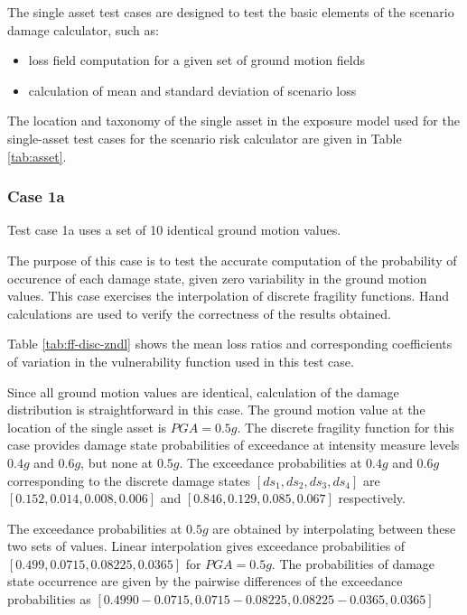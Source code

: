 The single asset test cases are designed to test the basic elements of the scenario damage calculator, such as:

\begin{itemize}
\item loss field computation for a given set of ground motion fields
\item calculation of mean and standard deviation of scenario loss
\end{itemize}

The location and taxonomy of the single asset in the exposure model used for the single-asset test cases for the scenario risk calculator are given in Table \ref{tab:asset}.

\subsubsection{Case 1a}
Test case 1a uses a set of 10 identical ground motion values.

The purpose of this case is to test the accurate computation of the probability of occurence of each damage state, given zero variability in the ground motion values. This case exercises the interpolation of discrete fragility functions. Hand calculations are used to verify the correctness of the results obtained.

% 




Table \ref{tab:ff-disc-zndl} shows the mean loss ratios and corresponding coefficients of variation in the vulnerability function used in this test case.

Since all ground motion values are identical, calculation of the damage distribution is straightforward in this case. The ground motion value at the location of the single asset is $PGA = 0.5 g$. The discrete fragility function for this case provides damage state probabilities of exceedance at intensity measure levels $0.4 g$ and $0.6 g$, but none at $0.5 g$. The exceedance probabilities at $0.4 g$ and $0.6 g$ corresponding to the discrete damage states $[ds_1, ds_2, ds_3, ds_4]$ are $[0.152, 0.014, 0.008, 0.006]$ and $[0.846, 0.129, 0.085, 0.067]$ respectively.

The exceedance probabilities at $0.5 g$ are obtained by interpolating between these two sets of values. Linear interpolation gives exceedance probabilities of $[0.499, 0.0715, 0.08225, 0.0365]$ for $PGA = 0.5 g$. The probabilities of damage state occurrence are given by the pairwise differences of the exceedance probabilities as $[0.4990 - 0.0715, 0.0715 - 0.08225, 0.08225 - 0.0365, 0.0365]$

